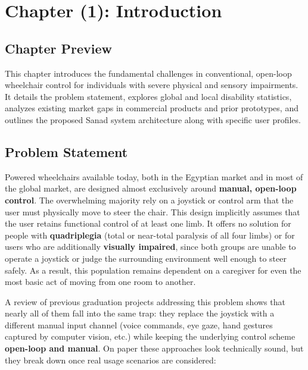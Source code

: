 \setcounter{chapter}{1}
\chapter*{Chapter (1): Introduction}
\renewcommand{\thesection}{\thechapter.\arabic{section}}
\setcounter{section}{0}

\section{Chapter Preview}
This chapter introduces the fundamental challenges in conventional, open-loop wheelchair control for individuals with severe physical and sensory impairments. It details the problem statement, explores global and local disability statistics, analyzes existing market gaps in commercial products and prior prototypes, and outlines the proposed Sanad system architecture along with specific user profiles.

\section{Problem Statement}

Powered wheelchairs available today, both in the Egyptian market and in most of the global market, are designed almost exclusively around \textbf{manual, open-loop control}. The overwhelming majority rely on a joystick or control arm that the user must physically move to steer the chair. This design implicitly assumes that the user retains functional control of at least one limb. It offers no solution for people with \textbf{quadriplegia} (total or near-total paralysis of all four limbs) or for users who are additionally \textbf{visually impaired}, since both groups are unable to operate a joystick or judge the surrounding environment well enough to steer safely. As a result, this population remains dependent on a caregiver for even the most basic act of moving from one room to another.

A review of previous graduation projects addressing this problem shows that nearly all of them fall into the same trap: they replace the joystick with a different manual input channel (voice commands, eye gaze, hand gestures captured by computer vision, etc.) while keeping the underlying control scheme \textbf{open-loop and manual}. On paper these approaches look technically sound, but they break down once real usage scenarios are considered:

